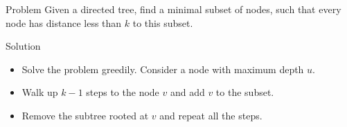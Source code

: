 \begin{frame}
    \frametitle{\problemtitle}
  \begin{block}{Problem}
        Given a directed tree, find a minimal subset of nodes, such that every node has distance less than $k$ to this subset.
    \end{block}
    \begin{block}{Solution}
        \begin{itemize}
            \item<+-> Solve the problem greedily. Consider a node with maximum depth $u$.
            \item<+-> Walk up $k-1$ steps to the node $v$ and add $v$ to the subset.
            \item<+-> Remove the subtree rooted at $v$ and repeat all the steps.
        \end{itemize}
    \end{block}
\end{frame}
